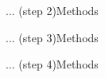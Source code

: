 
\begin{frame}{... (step 2)}{Methods}
	\Itemize{
		\item 
		\item 
	}
\end{frame}

\begin{frame}{... (step 3)}{Methods}
	\Itemize{
		\item 
		\item 
	}
\end{frame}

\begin{frame}{... (step 4)}{Methods}
	\Itemize{
		\item 
		\item 
	}
\end{frame}


